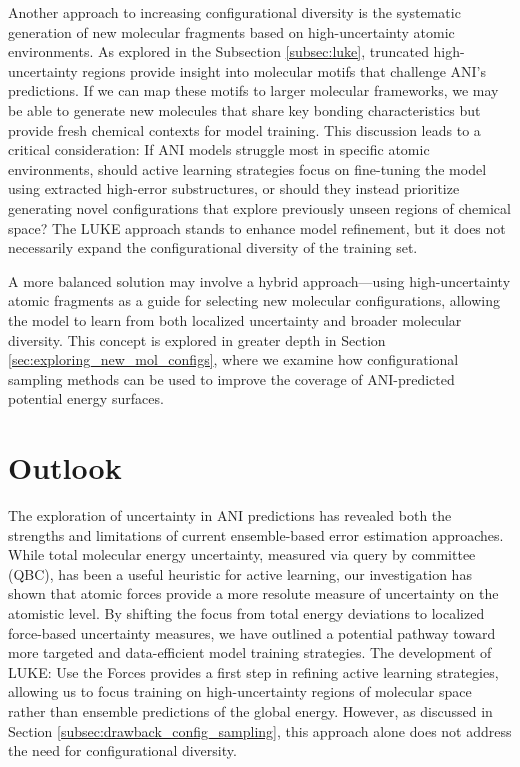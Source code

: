 Another approach to increasing configurational diversity is the systematic generation of new molecular fragments based on high-uncertainty atomic environments. 
As explored in the Subsection \ref{subsec:luke}, truncated high-uncertainty regions provide insight into molecular motifs that challenge ANI’s predictions. 
If we can map these motifs to larger molecular frameworks, we may be able to generate new molecules that share key bonding characteristics but provide fresh chemical contexts for model training.
This discussion leads to a critical consideration: If ANI models struggle most in specific atomic environments, should active learning strategies focus on fine-tuning the model using extracted high-error substructures, or should they instead prioritize generating novel configurations that explore previously unseen regions of chemical space? 
The LUKE approach stands to enhance model refinement, but it does not necessarily expand the configurational diversity of the training set.

A more balanced solution may involve a hybrid approach—using high-uncertainty atomic fragments as a guide for selecting new molecular configurations, allowing the model to learn from both localized uncertainty and broader molecular diversity. 
This concept is explored in greater depth in Section \ref{sec:exploring_new_mol_configs}, where we examine how configurational sampling methods can be used to improve the coverage of ANI-predicted potential energy surfaces.

\section{Outlook}

The exploration of uncertainty in ANI predictions has revealed both the strengths and limitations of current ensemble-based error estimation approaches.
While total molecular energy uncertainty, measured via query by committee (QBC), has been a useful heuristic for active learning, our investigation has shown that atomic forces provide a more resolute measure of uncertainty on the atomistic level.
By shifting the focus from total energy deviations to localized force-based uncertainty measures, we have outlined a potential pathway toward more targeted and data-efficient model training strategies.
The development of LUKE: Use the Forces provides a first step in refining active learning strategies, allowing us to focus training on high-uncertainty regions of molecular space rather than ensemble predictions of the global energy. 
However, as discussed in Section \ref{subsec:drawback_config_sampling}, this approach alone does not address the need for configurational diversity.

